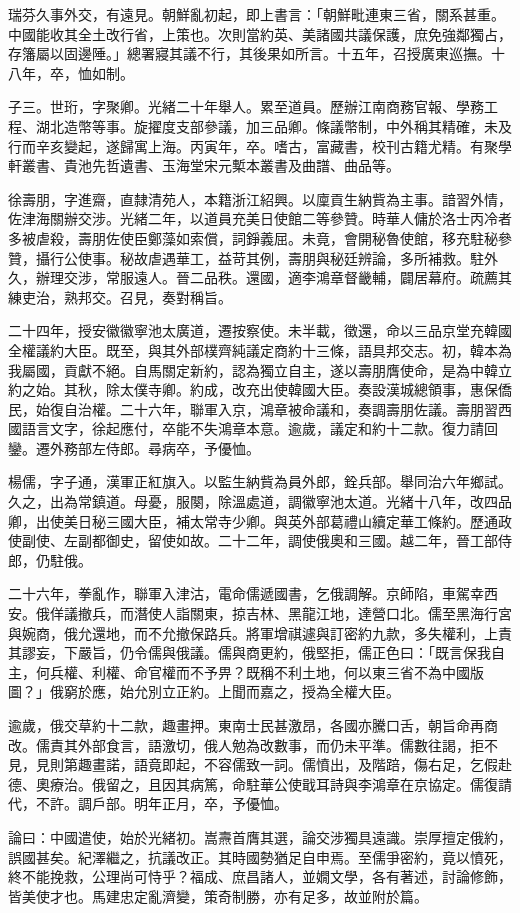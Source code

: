 \begin{pinyinscope}
瑞芬久事外交，有遠見。朝鮮亂初起，即上書言：「朝鮮毗連東三省，關系甚重。中國能收其全土改行省，上策也。次則當約英、美諸國共議保護，庶免強鄰獨占，存籓屬以固邊陲。」總署寢其議不行，其後果如所言。十五年，召授廣東巡撫。十八年，卒，恤如制。

子三。世珩，字聚卿。光緒二十年舉人。累至道員。歷辦江南商務官報、學務工程、湖北造幣等事。旋擢度支部參議，加三品卿。條議幣制，中外稱其精確，未及行而辛亥變起，遂歸寓上海。丙寅年，卒。嗜古，富藏書，校刊古籍尤精。有聚學軒叢書、貴池先哲遺書、玉海堂宋元槧本叢書及曲譜、曲品等。

徐壽朋，字進齋，直隸清苑人，本籍浙江紹興。以廩貢生納貲為主事。諳習外情，佐津海關辦交涉。光緒二年，以道員充美日使館二等參贊。時華人傭於洛士丙冷者多被虐殺，壽朋佐使臣鄭藻如索償，詞錚義屈。未竟，會開秘魯使館，移充駐秘參贊，攝行公使事。秘故虐遇華工，益苛其例，壽朋與秘廷辨論，多所補救。駐外久，辦理交涉，常服遠人。晉二品秩。還國，適李鴻章督畿輔，闢居幕府。疏薦其練吏治，熟邦交。召見，奏對稱旨。

二十四年，授安徽徽寧池太廣道，遷按察使。未半載，徵還，命以三品京堂充韓國全權議約大臣。既至，與其外部樸齊純議定商約十三條，語具邦交志。初，韓本為我屬國，貢獻不絕。自馬關定新約，認為獨立自主，遂以壽朋膺使命，是為中韓立約之始。其秋，除太僕寺卿。約成，改充出使韓國大臣。奏設漢城總領事，惠保僑民，始復自治權。二十六年，聯軍入京，鴻章被命議和，奏調壽朋佐議。壽朋習西國語言文字，徐起應付，卒能不失鴻章本意。逾歲，議定和約十二款。復力請回鑾。遷外務部左侍郎。尋病卒，予優恤。

楊儒，字子通，漢軍正紅旗入。以監生納貲為員外郎，銓兵部。舉同治六年鄉試。久之，出為常鎮道。母憂，服闋，除溫處道，調徽寧池太道。光緒十八年，改四品卿，出使美日秘三國大臣，補太常寺少卿。與英外部葛禮山續定華工條約。歷通政使副使、左副都御史，留使如故。二十二年，調使俄奧和三國。越二年，晉工部侍郎，仍駐俄。

二十六年，拳亂作，聯軍入津沽，電命儒遞國書，乞俄調解。京師陷，車駕幸西安。俄佯議撤兵，而潛使人詣關東，掠吉林、黑龍江地，達營口北。儒至黑海行宮與婉商，俄允還地，而不允撤保路兵。將軍增祺遽與訂密約九款，多失權利，上責其謬妄，下嚴旨，仍令儒與俄議。儒與商更約，俄堅拒，儒正色曰：「既言保我自主，何兵權、利權、命官權而不予畀？既稱不利土地，何以東三省不為中國版圖？」俄窮於應，始允別立正約。上聞而嘉之，授為全權大臣。

逾歲，俄交草約十二款，趣畫押。東南士民甚激昂，各國亦騰口舌，朝旨命再商改。儒責其外部食言，語激切，俄人勉為改數事，而仍未平準。儒數往謁，拒不見，見則第趣畫諾，語竟即起，不容儒致一詞。儒憤出，及階踣，傷右足，乞假赴德、奧療治。俄留之，且因其病篤，命駐華公使戢耳詩與李鴻章在京協定。儒復請代，不許。調戶部。明年正月，卒，予優恤。

論曰：中國遣使，始於光緒初。嵩燾首膺其選，論交涉獨具遠識。崇厚擅定俄約，誤國甚矣。紀澤繼之，抗議改正。其時國勢猶足自申焉。至儒爭密約，竟以憤死，終不能挽救，公理尚可恃乎？福成、庶昌諸人，並嫺文學，各有著述，討論修飾，皆美使才也。馬建忠定亂濟變，策奇制勝，亦有足多，故並附於篇。


\end{pinyinscope}